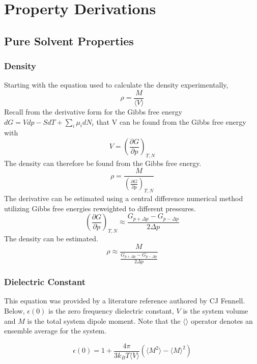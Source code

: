 \documentclass[a4paper,12pt]{article}
\begin{document}
\appendix
\section{Property Derivations}
\subsection{Pure Solvent Properties}
\subsubsection{Density}
\noindent Starting with the equation used to calculate the density experimentally, 
\begin{equation} \rho = \frac{M}{\langle V \rangle} \end{equation}
\noindent Recall from the derivative form for the Gibbs free energy $dG = Vdp -SdT + \sum_i \mu_i dN_i$ that V can be found from the Gibbs free energy with
\begin{equation} V = \left( \frac{\partial G}{\partial p} \right)_{T,N} \end{equation}
\noindent The density can therefore be found from the Gibbs free energy.
\begin{equation} \rho = \frac{M}{ \left( \frac{\partial G}{\partial p} \right)_{T,N}} \end{equation}
\noindent The derivative can be estimated using a central difference numerical method utilizing Gibbs free energies reweighted to different pressures.
\begin{equation} \left( \frac{\partial G}{\partial p} \right)_{T,N} \approx \frac{G_{p + \Delta p} - G_{p-\Delta p}}{2\Delta p} \end{equation}
\noindent The density can be estimated.
\begin{equation} \rho \approx \frac{M}{\frac{G_{p + \Delta p} - G_{p-\Delta p}}{2\Delta p}} \end{equation}


\subsubsection{Dielectric Constant}
\noindent This equation was provided by a literature reference authored by CJ Fennell\cite{dielec}. Below, $\epsilon(0)$ is the zero frequency dielectric constant, $V$ is the system volume and $M$ is the total system dipole moment. Note that the $\langle \rangle$ operator denotes an ensemble average for the system.

\begin{equation} \epsilon(0) = 1 + \frac{4 \pi}{3 k_B T \langle V \rangle}(\langle M^2 \rangle - \langle M \rangle^2) \end{equation}
\end{document}
